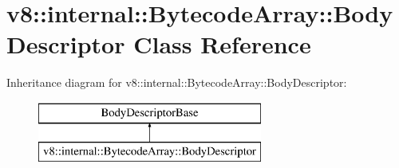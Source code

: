 \hypertarget{classv8_1_1internal_1_1_bytecode_array_1_1_body_descriptor}{}\section{v8\+:\+:internal\+:\+:Bytecode\+Array\+:\+:Body\+Descriptor Class Reference}
\label{classv8_1_1internal_1_1_bytecode_array_1_1_body_descriptor}
Inheritance diagram for v8\+:\+:internal\+:\+:Bytecode\+Array\+:\+:Body\+Descriptor\+:\begin{figure}[H]
\begin{center}
\leavevmode
\includegraphics[height=2.000000cm]{classv8_1_1internal_1_1_bytecode_array_1_1_body_descriptor}
\end{center}
\end{figure}
